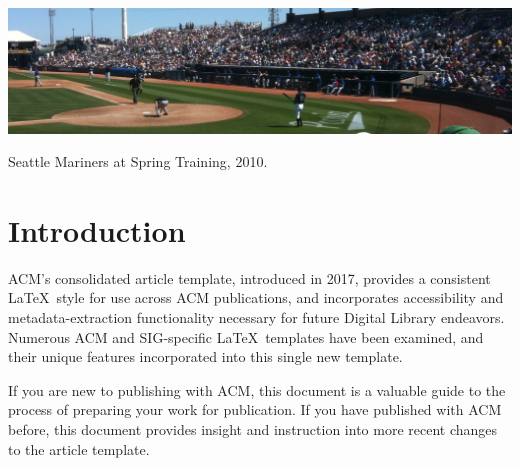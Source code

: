 \documentclass[sigconf, authordraft]{acmart}
\begin{document}
	 
	 


	\begin{teaserfigure}
		\includegraphics[width=\textwidth]{sampleteaser}
		\caption{Seattle Mariners at Spring Training, 2010.}
		\label{fig:teaser}
	\end{teaserfigure}

	  

	\maketitle


	\section{Introduction}
	ACM's consolidated article template, introduced in 2017, provides a consistent
	\LaTeX\ style for use across ACM publications, and incorporates accessibility
	and metadata-extraction functionality necessary for future Digital Library
	endeavors. Numerous ACM and SIG-specific \LaTeX\ templates have been examined,
	and their unique features incorporated into this single new template.

	If you are new to publishing with ACM, this document is a valuable guide to the
	process of preparing your work for publication. If you have published with ACM
	before, this document provides insight and instruction into more recent changes
	to the article template.
\end{document}
